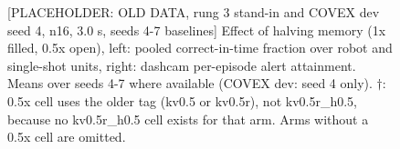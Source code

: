 \documentclass[sigconf]{acmart}
\begin{document}
{\selectfont
\begin{figure}[t]
  \centering
  
  \caption{[PLACEHOLDER: OLD DATA, rung 3 stand-in and COVEX dev seed 4, n16, 3.0 s, seeds 4-7 baselines] Effect of halving memory (1x filled, 0.5x open), left: pooled correct-in-time fraction over robot and single-shot units, right: dashcam per-episode alert attainment. Means over seeds 4-7 where available (COVEX dev: seed 4 only). $\dagger$: 0.5x cell uses the older tag (kv0.5 or kv0.5r), not kv0.5r\_h0.5, because no kv0.5r\_h0.5 cell exists for that arm. Arms without a 0.5x cell are omitted.}
  \label{fig:F08_memory}
\end{figure}
}


\end{document}
